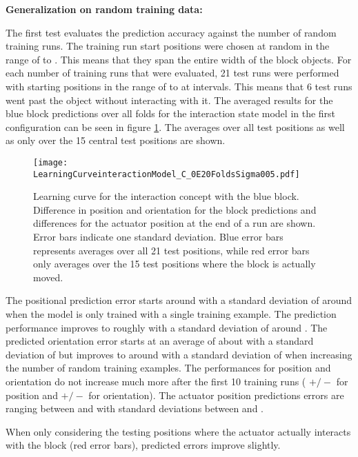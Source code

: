 \textbf{Generalization on random training data:}

The first test evaluates the prediction accuracy against the number of random training runs. The training run start positions were chosen at random in the range of  to . This means that they span the entire width of the block objects.
For each number of training runs that were evaluated, 21 test runs were performed with starting positions in the range of  to  at  intervals. This means that 6 test runs went past the object without interacting with it.
The averaged results for the blue block predictions over all folds for the interaction state model in the first configuration can be seen in figure \ref{fig:learnCurveInteraction1}. The averages over all test positions as well as only over the 15 central test positions are shown.

\begin{figure}[h]
\centering
\texttt{[image: LearningCurveinteractionModel\_C\_0E20FoldsSigma005.pdf]}
\caption{Learning curve for the interaction concept with the blue block. Difference in position and orientation for the block predictions and differences for the actuator position at the end of a run are shown. Error bars indicate one standard deviation. Blue error bars represents averages over all 21 test positions, while red error bars only averages over the 15 test positions where the block is actually moved.}
\label{fig:learnCurveInteraction1}
\end{figure}

The positional prediction error starts around  with a standard deviation of around  when the model is only trained with a single training example. The prediction performance improves to roughly  with a standard deviation of around .
The predicted orientation error starts at an average of about  with a standard deviation of  but improves to around  with a standard deviation of  when increasing the number of random training examples.
The performances for position and orientation do not increase much more after the first 10 training runs ( $+/-$  for position and  $+/-$  for orientation).
The actuator position predictions errors are ranging between  and  with standard deviations between  and .

When only considering the testing positions where the actuator actually interacts with the block (red error bars), predicted errors improve slightly.

